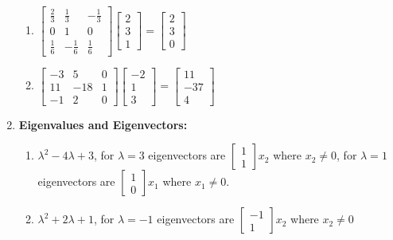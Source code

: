 \begin{multicols}{2}
\begin{enumerate}
\begin{enumerate}
	\item 
$
\begin{bmatrix}
 \frac{2}{3} & \frac{1}{3} & -\frac{1}{3} \\
 0 & 1 & 0 \\
 \frac{1}{6} & -\frac{1}{6} & \frac{1}{6}
\end{bmatrix}
\begin{bmatrix}
 2 \\
 3 \\
 1
\end{bmatrix}
=
\begin{bmatrix}
 2 \\
 3 \\
 0
\end{bmatrix}
$


	\item 
$
\begin{bmatrix}
 -3 & 5 & 0 \\
 11 & -18 & 1 \\
 -1 & 2 & 0
\end{bmatrix}
\begin{bmatrix}
 -2 \\
 1 \\
 3
\end{bmatrix}
=
\begin{bmatrix}
 11 \\
 -37 \\
 4
\end{bmatrix}
$


\end{enumerate}





\item \textbf{Eigenvalues and Eigenvectors:} 
\begin{enumerate}
	\item 
$\lambda ^2-4 \lambda +3$,
for 
$\lambda=3$
eigenvectors are
$\begin{bmatrix}1\\ 1\end{bmatrix}x_2$ where  $x_2\neq 0$, 
for
$\lambda=1$ 
eigenvectors are
$\begin{bmatrix}1\\ 0\end{bmatrix}x_1$ where $x_1\neq 0$.




	\item 
$\lambda ^2+2 \lambda +1$,
for 
$\lambda=-1$
eigenvectors are
$\begin{bmatrix}-1\\ 1\end{bmatrix}x_2$ where  $x_2\neq 0$




\end{enumerate}
\end{enumerate}
\end{multicols}
